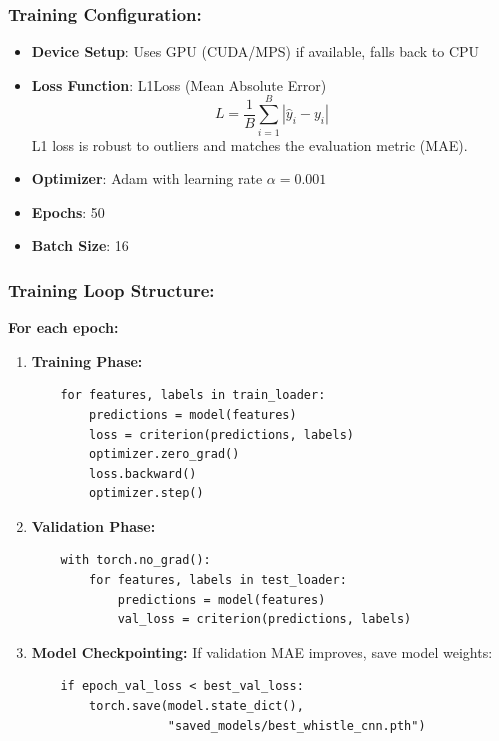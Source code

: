 \subsubsection{Training Configuration:}
\begin{itemize}
    \item \textbf{Device Setup}: Uses GPU (CUDA/MPS) if available, falls back to CPU
    \item \textbf{Loss Function}: L1Loss (Mean Absolute Error)
    \begin{equation}\label{l1_loss}
        L = \frac{1}{B} \sum_{i=1}^{B} |\hat{y}_i - y_i|
    \end{equation}
    L1 loss is robust to outliers and matches the evaluation metric (MAE).
    
    \item \textbf{Optimizer}: Adam with learning rate $\alpha = 0.001$
    \item \textbf{Epochs}: 50
    \item \textbf{Batch Size}: 16
\end{itemize}

\subsubsection{Training Loop Structure:}

\textbf{For each epoch:}
\begin{enumerate}
    \item \textbf{Training Phase:}
    \begin{verbatim}
    for features, labels in train_loader:
        predictions = model(features)
        loss = criterion(predictions, labels)
        optimizer.zero_grad()
        loss.backward()
        optimizer.step()
    \end{verbatim}
    
    \item \textbf{Validation Phase:}
    \begin{verbatim}
    with torch.no_grad():
        for features, labels in test_loader:
            predictions = model(features)
            val_loss = criterion(predictions, labels)
    \end{verbatim}
    
    \item \textbf{Model Checkpointing:}
    If validation MAE improves, save model weights:
    \begin{verbatim}
    if epoch_val_loss < best_val_loss:
        torch.save(model.state_dict(), 
                   "saved_models/best_whistle_cnn.pth")
    \end{verbatim}
\end{enumerate}

